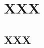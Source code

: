 \documentclass[11pt]{amsbook}
\begin{document}
\chapter{XXX}
\label{chap:FuncLimCont}




\section{XXX}
\label{sec:Numbers}






\end{document}
